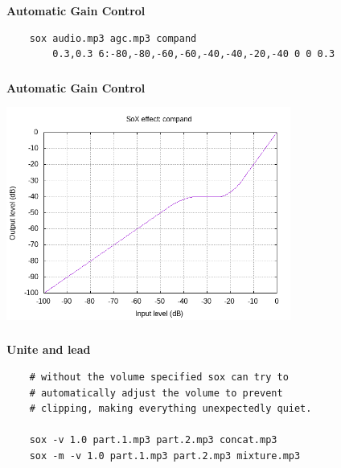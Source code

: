 \documentclass[usenames,dvipsnames, 18pt, compress, aspectratio=169]{beamer}
\begin{document}
\begin{frame}[fragile]{}
    \frametitle{}
    \begin{center}
        \textbf{Automatic Gain Control}
        \vspace{0.2cm}


        \begin{verbatim}
    sox audio.mp3 agc.mp3 compand
        0.3,0.3 6:-80,-80,-60,-60,-40,-40,-20,-40 0 0 0.3
        \end{verbatim}
    \end{center}
\end{frame}

\begin{frame}[fragile]{}
    \frametitle{}
    \begin{center}
        \textbf{Automatic Gain Control}
        \vspace{0.2cm}

        \includegraphics[width=0.7\textwidth]{agc.png}

    \end{center}
\end{frame}

\begin{frame}[fragile]{}
    \frametitle{}
    \begin{center}
        \textbf{Unite and lead}
        \vspace{0.2cm}

        \begin{verbatim}
    # without the volume specified sox can try to
    # automatically adjust the volume to prevent
    # clipping, making everything unexpectedly quiet.

    sox -v 1.0 part.1.mp3 part.2.mp3 concat.mp3
    sox -m -v 1.0 part.1.mp3 part.2.mp3 mixture.mp3
        \end{verbatim}
    \end{center}
\end{frame}
\end{document}
